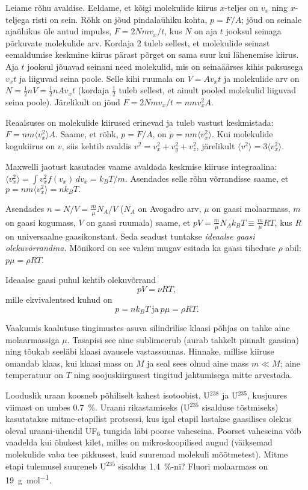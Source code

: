 \documentclass[a4paper,11pt,twocolumn]{article}
\begin{document}
Leiame rõhu avaldise. Eeldame, et kõigi molekulide kiirus \( x \)-teljes on \( v_x \) ning \( x \)-teljega risti on sein. Rõhk on jõud pindalaühiku kohta, \( p=F/A \); jõud on seinale ajaühikus üle antud impulss, \( F=2Nmv_x/t \), kus \( N \) on aja \( t \) jooksul seinaga põrkuvate molekulide arv. Kordaja 2 tuleb sellest, et molekulide seinast eemaldumise keskmine kiirus pärast põrget on sama suur kui lähenemise kiirus. Aja \( t \) jooksul jõuavad seinani need molekulid, mis on seinaäärses kihis paksusega \( v_x t \) ja liiguvad seina poole. Selle kihi ruumala on \( V=Av_xt \) ja molekulide arv on \( N=\frac{1}{2}nV = \frac{1}{2}nAv_xt \) (kordaja \( \frac{1}{2} \) tuleb sellest, et ainult pooled molekulid liiguvad seina poole). Järelikult on jõud \( F=2Nmv_x/t=nmv_{x}^2A \). 

Reaalsuses on molekulide kiirused erinevad ja tuleb vastust keskmistada: \( F=nm\langle v_{x}^2 \rangle A \). Saame, et rõhk, \( p=F/A \), on \( p=nm\langle v_{x}^2 \rangle. \) Kui molekulide kogukiirus on \( v \), siis kehtib avaldis \( v^2=v_x^2+v_y^2+v_z^2 \), järelikult \( \langle v^2 \rangle = 3 \langle v_x^2 \rangle \). 

Maxwelli jaotust kasutades vaame avaldada keskmise kiiruse integraalina: \( \langle v_x^2 \rangle = \int v_x^2 f(v_x) \, dv_x =k_B T/m \). Asendades selle rõhu võrrandisse saame, et \( p=nm\langle v_{x}^2 \rangle=nk_B T. \) 

Asendades \( n=N/V=\frac{m}{\mu}N_A/V \) (\( N_A \) on Avogadro arv, \( \mu \) on gaasi molaarmass, \( m \) on gaasi kogumass, \( V \) on gaasi ruumala) saame, et \( pV=\frac{m}{\mu}N_A k_B T \equiv \frac{m}{\mu}RT \), kus \( R \) on universaalne gaasikonstant. Seda seadust tuntakse \textit{ideaalse gaasi olekuvõrrandina.} Mõnikord on see valem mugav esitada ka gaasi tiheduse \( \rho \) abil: \( p\mu=\rho RT \).

Ideaalse gaasi puhul kehtib olekuvõrrand 
\[ pV=\nu RT, \] 
mille ekvivalentsed kuhud on 
\[ p=n k_B T \ \textrm{ja}\ p\mu=\rho RT. \]

\begin{question}
	Vaakumis kaalutuse tingimustes asuva silindrilise klaasi põhjas on tahke aine molaarmassiga \( \mu \). Tasapisi see aine sublimeerub (aurab tahkelt pinnalt gaasina) ning tõukab seeläbi klaasi avausele vastassuunas. Hinnake, millise kiiruse	omandab klaas, kui klaasi mass on \( M \) ja seal sees olnud aine mass \( m \ll M \); aine temperatuur on \( T \) ning soojuskiirgusest tingitud jahtumisega mitte arvestada.
\end{question}
\begin{question}
	Looduslik uraan koosneb põhiliselt kahest isotoobist, U\( ^{238} \) ja U\( ^{235} \), kusjuures viimast on umbes \SI{0,7}{\percent}. Uraani rikastamiseks (U\( ^{235} \) sisalduse tõstmiseks) kasutatakse mitme-etapilist protsessi, kus igal etapil lastakse gaasilises olekus oleval uraani-ühendil UF\( _{6} \) tungida läbi poorse vaheseina. Poorset vaheseina võib vaadelda kui õhukest kilet, milles on mikroskoopilised augud (väiksemad molekulide vaba tee pikkusest, kuid suuremad molekuli mõõtmetest). Mitme etapi tulemusel suureneb U\( ^{235} \) sisaldus \SI{1,4}{\percent}-ni? Fluori molaarmass on \SI{19}{\g\per\mol}.
\end{question}
\end{document}
